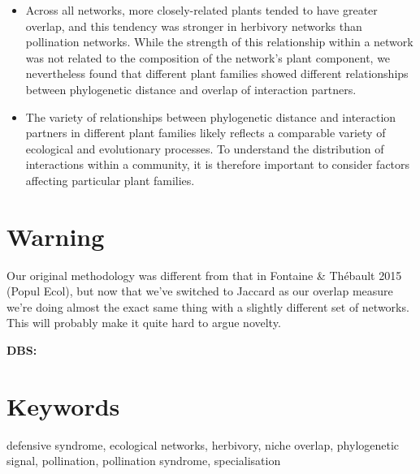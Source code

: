 \documentclass[12pt]{article}
\begin{document}
\begin{spacing}{1.0}
\begin{itemize}
    \item Across all networks, more closely-related plants tended to have 
          greater overlap, and this tendency was stronger in herbivory 
          networks than pollination networks. While the strength of this relationship within a network was not related to the composition of the network's plant component, we nevertheless found that different plant families showed different relationships between phylogenetic distance and overlap of interaction partners.


    \item The variety of relationships between phylogenetic distance and
          interaction partners in different plant families likely
          reflects a comparable variety of ecological and evolutionary processes. To 
          understand the distribution of interactions within a community, 
          it is therefore important to consider factors affecting particular 
          plant families.

  \end{itemize}

\section*{Warning}

Our original methodology was different from that in Fontaine \& Th\'{e}bault 2015 (Popul Ecol), but now that we've switched to Jaccard as our overlap measure we're doing almost the exact same thing with a slightly different set of networks. This will probably make it quite hard to argue novelty.

\textbf{DBS: }


\section*{Keywords}

defensive syndrome, ecological networks, herbivory, niche overlap, phylogenetic signal, pollination, pollination syndrome, specialisation

\end{spacing}
\end{document}
